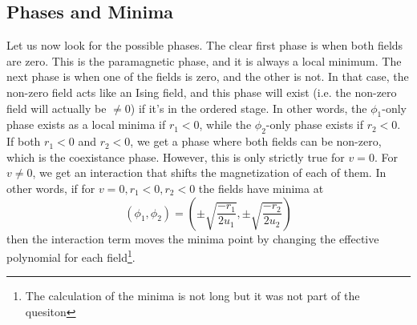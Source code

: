 \documentclass{article}
\begin{document}
\subsection{Phases and Minima}
Let us now look for the possible phases. The clear first phase is when both fields are zero. This is the paramagnetic phase, and it is always a local minimum.
\newline
The next phase is when one of the fields is zero, and the other is not. In that case, the non-zero field acts like an Ising field, and this phase will exist (i.e. the non-zero field will actually be $\ne 0$) if it's in the ordered stage.
In other words, the $\phi_1$-only phase exists as a local minima if $r_1 < 0$, while the $\phi_2$-only phase exists if $r_2 < 0$. If both $r_1 < 0$ and $r_2 < 0$, we get a phase where both fields can be non-zero, which is the coexistance phase.
\newline
However, this is only strictly true for $v = 0$. For $v \ne 0$, we get an interaction that shifts the magnetization of each of them. In other words, if for $v = 0, r_1 < 0, r_2 < 0$ the fields have minima at
\begin{equation}
    (\phi_1, \phi_2) = \left(
        \pm \sqrt{\frac{-r_1}{2u_1}},
        \pm \sqrt{\frac{-r_2}{2u_2}}
    \right)
\end{equation}
then the interaction term moves the minima point by changing the effective polynomial for each field\footnote{The calculation of the minima is not long but it was not part of the quesiton}.
\end{document}

